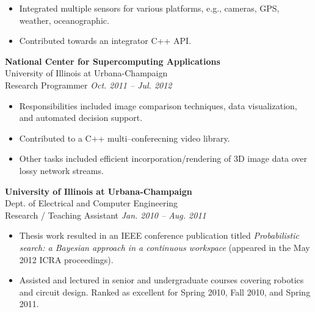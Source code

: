 \documentclass{article}
\begin{document}
{\begin{multicols}{2}
\begin{itemize}[noitemsep,nolistsep]
        \item Integrated multiple sensors for various platforms, e.g., cameras, GPS, weather, oceanographic.
        \item Contributed towards an integrator C++ API.
    \end{itemize}
    \vspace{10px}
    \textbf{National Center for Supercomputing Applications}\\
    University of Illinois at Urbana-Champaign\\
    Research Programmer \hfill \textsl{Oct. 2011 -- Jul. 2012}\\
    \vspace{ -10px}
    \begin{itemize}[noitemsep,nolistsep]
        \item Responsibilities included image comparison techniques, data visualization, and automated decision support. 
        \item Contributed to a C++ multi--conferecning video library.  
        \item Other tasks included efficient incorporation/rendering of 3D image data over lossy network streams.  
    \end{itemize}
    \vspace{10px}
    \textbf{University of Illinois at Urbana-Champaign}\\ 
    Dept. of Electrical and Computer Engineering\\
    Research / Teaching Assistant \hfill \textsl{Jan. 2010 -- Aug. 2011} \\
    \vspace{ -10px}
    \begin{itemize}[noitemsep,nolistsep]
	 \item Thesis work resulted in an IEEE conference publication titled \textsl{Probabilistic search: a Bayesian approach in a continuous workspace} (appeared in the May 2012 ICRA proceedings).  
        \item Assisted and lectured in senior and undergraduate courses covering robotics and circuit design. Ranked as excellent for Spring 2010, Fall 2010, and Spring 2011.
    \end{itemize}
    \vspace{10px}
    \vfill\null

\end{multicols}}
\end{document}
